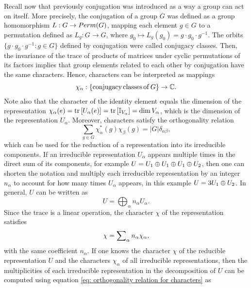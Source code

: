 Recall now that previously conjugation was introduced as a way a group can act on itself. More precisely, the conjugation of a group $G$ was defined as a group homomorphism $L : G \to {Perm}(G)$, mapping each element $g \in G$ to a permutation defined as $L_g : G \to G$, where $g_0 \mapsto L_g(g_0) = g\cdot g_0 \cdot g^{-1}$. The orbits $\{g\cdot g_0 \cdot g^{-1} : g \in G\}$ defined by conjugation were called conjugacy classes. Then, the invariance of the trace of products of matrices under cyclic permutations of its factors implies that group elements related to each other by conjugation have the same characters. Hence, characters can be interpreted as mappings
\begin{equation}
    \chi_\alpha : \{\mathrm{conjugacy\,classes\,of}\,G\} \to \mathbb{C}.
\end{equation}
Note also that the character of the identity element equals the dimension of the representation $\chi_\alpha(e) = \mathrm{tr}\,{[U_\alpha(e)]} =\mathrm{tr}\,{[\mathbb{I}_{V_\alpha}]} = \dim{V_\alpha}$, which is the dimension of the representation $U_\alpha$. Moreover, characters satisfy the orthogonality relation
\begin{equation}
\label{eq: orthogonality relation for characters}
    \sum_{g \in G}\chi_\alpha^*(g)\chi_\beta(g) = |G|\delta_{\alpha\beta},
\end{equation}
which can be used for the reduction of a representation into its irreducible components. If an irreducible representation $U_\alpha$ appears multiple times in the direct sum of its components, for example $U = U_1 \oplus U_1 \oplus U_1 \oplus U_2$, then one can shorten the notation and multiply each irreducible representation by an integer $n_\alpha$ to account for how many times $U_\alpha$ appears, in this example $U = 3U_1 \oplus U_2$. In general, $U$ can be written as
\begin{equation}
    U = \bigoplus\nolimits_\alpha n_\alpha U_\alpha.
\end{equation}
Since the trace is a linear operation, the character $\chi$ of the representation satisfies 
\begin{equation}
    \chi = \sum\nolimits_\alpha n_\alpha\chi_\alpha,
\end{equation}
with the same coefficient $n_\alpha$. If one knows the character $\chi$ of the reducible representation $U$ and the characters $\chi_\alpha$ of all irreducible representations, then the multiplicities of each irreducible representation in the decomposition of $U$ can be computed using equation \eqref{eq: orthogonality relation for characters} as
